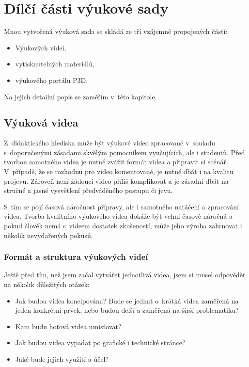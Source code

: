 \chapter{Dílčí části výukové sady}
Mnou vytvořená výuková sada se skládá ze tří vzájemně propojených částí:
\begin{itemize}[topsep=0pt]
    \setlength\itemsep{0em}
    \item Výukových videí,
    \item vytisknutelných materiálů,
    \item výukového portálu P3D.
\end{itemize}
Na jejich detailní popis se zaměřím v~této kapitole.

\section{Výuková videa}
Z~didaktického hlediska může být výukové video zpracované v~souladu s~doporučenými zásadami skvělým pomocníkem vyučujících, ale i studentů.
Před tvorbou samotného videa je nutné zvážit formát videa a připravit si scénář.
V~případě, že se rozhodnu pro video komentované, je nutné dbát i na kvalitu projevu.
Zároveň není žádoucí video příliš komplikovat a je zásadní dbát na stručné a jasné vysvětlení předváděného postupu či jevu.

S~tím se pojí časová náročnost přípravy, ale i samotného natáčení a zpracování videa.
Tvorba kvalitního výukového videa dokáže být velmi časově náročná a pokud člověk nemá s~videem dostatek zkušeností, může jeho výroba zahrnovat i několik nevydařených pokusů.

\subsection{Formát a struktura výukových videí}
Ještě před tím, než jsem začal vytvářet jednotlivá videa, jsem si musel odpovědět na několik důležitých otázek:
\begin{itemize}[topsep=0pt]
    \setlength\itemsep{0em}
    \item Jak budou videa koncipována? Bude se jednat o~krátká videa zaměřená na jeden konkrétní prvek, nebo budou delší a zaměřená na širší problematiku?
    \item Kam budu hotová videa umisťovat?
    \item Jak budou videa vypadat po grafické i technické stránce?
    \item Jaké bude jejich využití a účel?
\end{itemize}

